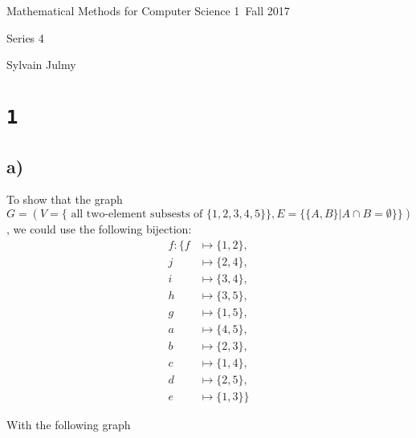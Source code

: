 \documentclass[a4paper,11pt]{report}
\author{Sylvain Julmy}
\date{\today}
\begin{document}
\begin{center}
  \Large{
    Mathematical Methods for Computer Science 1\
    Fall 2017
  }
  \noindent\makebox[\linewidth]{\rule{\linewidth}{0.4pt}}

  Series 4
  \vspace*{1.4cm}

  Sylvain Julmy
  
  \noindent\makebox[\linewidth]{\rule{\linewidth}{0.4pt}}
\end{center}

\section*{\texttt{1}}
\subsection*{a)}
To show that the graph $G = (V = \{\text{ all two-element subsests of }\{1,2,3,4,5\}\},
E =\{\{A,B\} | A \cap B= \emptyset \}\})$, we could use the following bijection:
\begin{align*}
  f : \{ f &\mapsto \{1,2\}, \\
         j &\mapsto \{2,4\}, \\
         i &\mapsto \{3,4\}, \\
         h &\mapsto \{3,5\}, \\
         g &\mapsto \{1,5\}, \\
         a &\mapsto \{4,5\}, \\
         b &\mapsto \{2,3\}, \\
         c &\mapsto \{1,4\}, \\
         d &\mapsto \{2,5\}, \\
         e &\mapsto \{1,3\}\}
\end{align*}

With the following graph

\begin{center}
\end{center}
\end{document}

